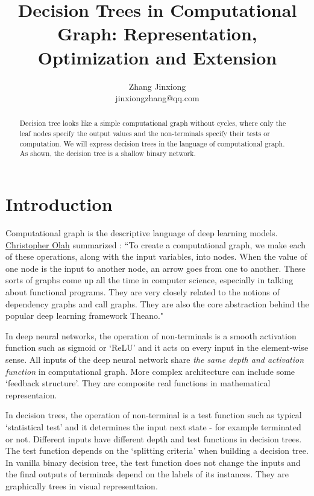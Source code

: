 \documentclass[UTF8]{article}
\title{Decision Trees in Computational Graph: Representation, Optimization and  Extension}
\author{Zhang Jinxiong\\
jinxiongzhang@qq.com}
\date{} %
\begin{document}
\maketitle

\begin{abstract}

Decision tree looks like a simple computational graph without cycles,
where only the leaf nodes specify the output values and the non-terminals specify their tests or computation.
We will express decision trees in the language of computational graph.
As shown, the decision tree is a shallow binary network.
\end{abstract}

\section{Introduction}

Computational graph is the descriptive language of deep learning models.
\href{https://colah.github.io/posts/2015-08-Backprop/}{Christopher Olah} summarized :
``To create a computational graph,
we make each of these operations, along with the input variables, into nodes.
When the value of one node  is the input to another node, an arrow goes from one to another.
These sorts of graphs come up all the time in computer science,
especially in talking about functional programs.
They are very closely related to the notions of dependency graphs and call graphs.
They are also the core abstraction behind the popular deep learning framework Theano."

In deep neural networks, the operation of non-terminals is a smooth activation function such as sigmoid or `ReLU'
and it acts on every input in the element-wise sense.
All inputs of the deep neural network share  \emph{the same depth and activation function} in computational graph.
More complex architecture can include some `feedback structure'.
They are composite real functions in mathematical representaion.

In decision trees, the operation of non-terminal is a test function such as typical `statistical test'
and it determines the input next state - for example terminated or not.
Different inputs have different depth and test functions in decision trees.
The test function depends on the `splitting criteria' when building a decision tree.
In vanilla binary decision tree, the test function does not change the inputs
and the final outputs of terminals depend on the labels of its instances.
They are graphically trees in visual representtaion.
\end{document}
